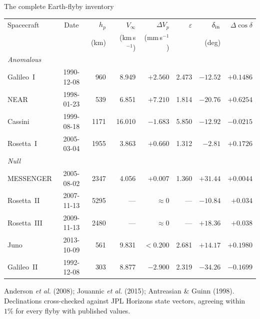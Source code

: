 \documentclass[aspectratio=169,10pt]{beamer}
\newcommand{\dVp}{\Delta V_p}
\newcommand{\Vinf}{V_\infty}
\newcommand{\Dcosd}{\Delta\!\cos\delta}
\newcommand{\eps}{\varepsilon}
\begin{document}
\begin{frame}{The complete Earth-flyby inventory}

  \vspace{-0.2em}
  \begin{center}
  \footnotesize
  \renewcommand{\arraystretch}{1.12}
  \begin{tabular}{l c r r r r r r}
    \toprule
    Spacecraft & Date & $h_p$ & $\Vinf$ & $\dVp$ & $\eps$ &
    $\delta_{\rm in}$ & $\Dcosd$\\
    & & (km) & (km\,s$^{-1}$) & (mm\,s$^{-1}$) & & (deg) & \\
    \midrule
    \multicolumn{8}{l}{\color{accent}\itshape Anomalous}\\
    Galileo~I   & 1990-12-08 & 960  & 8.949  & $+2.560$ & 2.473 & $-12.52$ & $+0.1486$\\
    NEAR        & 1998-01-23 & 539  & 6.851  & $+7.210$ & 1.814 & $-20.76$ & $+0.6254$\\
    Cassini     & 1999-08-18 & 1171 & 16.010 & $-1.683$ & 5.850 & $-12.92$ & $-0.0215$\\
    Rosetta~I   & 2005-03-04 & 1955 & 3.863  & $+0.660$ & 1.312 & $-2.81$  & $+0.1726$\\
    \midrule
    \multicolumn{8}{l}{\color{accentii}\itshape Null}\\
    MESSENGER   & 2005-08-02 & 2347 & 4.056  & $+0.007$ & 1.360 & $+31.44$ & $+0.0044$\\
    Rosetta~II  & 2007-11-13 & 5295 & ---    & $\approx0$ & --- & $-10.84$ & $+0.034$\\
    Rosetta~III & 2009-11-13 & 2480 & ---    & $\approx0$ & --- & $+18.36$ & $+0.038$\\
    Juno        & 2013-10-09 & 561  & 9.831  & $<0.200$ & 2.681 & $+14.17$ & $+0.1980$\\
    \midrule
    Galileo~II  & 1992-12-08 & 303  & 8.877  & $-2.900$ & 2.319 & $-34.26$ & $-0.1699$\\
    \bottomrule
  \end{tabular}
  \end{center}

  \vspace{0.25em}
  {\scriptsize
  Anderson \textit{et al.} (2008); Jouannic \textit{et al.} (2015); Antreasian
  \& Guinn (1998). Declinations cross-checked against JPL Horizons state
  vectors, agreeing within $1\%$ for every flyby with published values.}

\end{frame}
\end{document}
